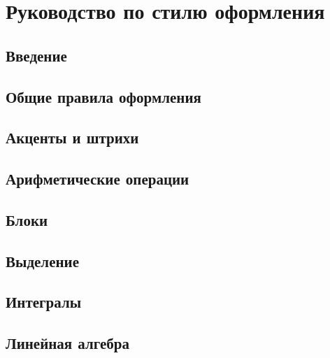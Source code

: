 \chapter{Руководство по стилю оформления}


\edef\arraystretchRestore{\arraystretch}
\newlength{\tabcolsepRestore}
\setlength{\tabcolsepRestore}{\tabcolsep}


\renewcommand{\arraystretch}{1.2}
\setlength{\tabcolsep}{3pt}


\section*{Введение}
    


\section{Общие правила оформления}
    


\section{Акценты и штрихи}
    


\section{Арифметические операции}
    


\section{Блоки}
    


\section{Выделение}
    


\section{Интегралы}
    


\section{Линейная алгебра}
    


